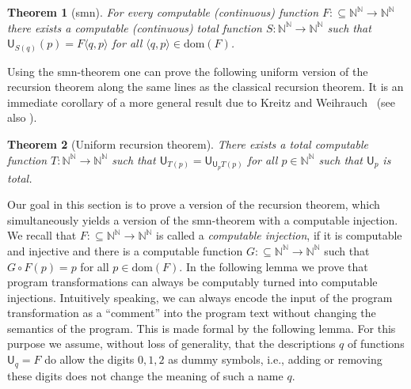 \documentclass[11pt,a4paper]{amsart}
\theoremstyle{plain}
\newtheorem{thm}{Theorem}[section]
\theoremstyle{definition}
\theoremstyle{defC}
\theoremstyle{thmC}
\theoremstyle{plain}
\numberwithin{equation}{section}
\def\IN{{\mathbb{N}}}
\def\In{\subseteq}
\def\U{{\mathsf{{U}}}}
\def\dom{{\mathrm{dom}}}
\begin{document}
\begin{thm}[smn]
\label{thm:smn}
For every computable (continuous) function ${F:\In\IN^\IN\to\IN^\IN}$ 
there exists a computable (continuous) total function
$S:\IN^\IN\to\IN^\IN$ such that $\U_{S(q)}(p)=F\langle q,p\rangle$ for all $\langle q,p\rangle\in\dom(F)$.
\end{thm}

\noindent
Using the smn-theorem one can prove the following uniform version of the recursion theorem along the same lines as the classical recursion theorem.
It is an immediate corollary of a more general result due to Kreitz and Weihrauch~\cite[Theorem~3.4]{KW85}  (see also \cite[Theorem~3.3.20]{Wei87}).

\begin{thm}[Uniform recursion theorem]
\label{thm:recursion-theorem}
There exists a total computable function ${T:\IN^\IN\to\IN^\IN}$ such that 
$\U_{T(p)}=\U_{\U_pT(p)}$
for all $p\in\IN^\IN$ such that $\U_p$ is total.
\end{thm}

\noindent
Our goal in this section is to prove a version of the recursion theorem, which simultaneously yields a
version of the smn-theorem with a computable injection. 
We recall that $F:\In\IN^\IN\to\IN^\IN$ is called a {\em computable injection}, if it is computable
and injective and there is a computable function $G:\In\IN^\IN\to\IN^\IN$ such that
$G\circ F(p)=p$ for all $p\in\dom(F)$.
In the following lemma we prove that program transformations can always be computably turned
into computable injections. 
Intuitively speaking, we can always encode the input of the program transformation
as a ``comment'' into the program text without changing the semantics of the program.
This is made formal by the following lemma.
For this purpose we assume, without loss of generality, that the descriptions $q$ of functions $\U_q=F$ do 
allow the digits $0,1,2$ as dummy symbols, i.e., adding or removing these digits does not change 
the meaning of such a name $q$.
\end{document}
